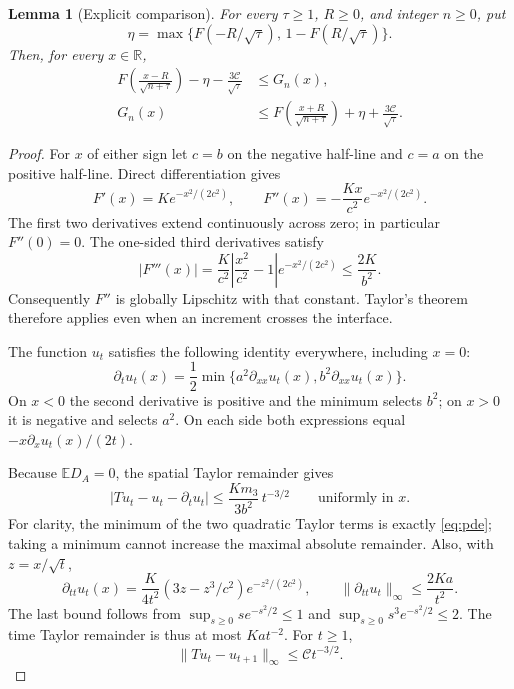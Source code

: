 \documentclass[11pt,a4paper]{article}
\newtheorem{lemma}[theorem]{Lemma}
\newcommand{\E}{\mathbb E}
\newcommand{\R}{\mathbb R}
\begin{document}
\begin{lemma}[Explicit comparison]\label{lem:comparison}
For every $\tau\ge1$, $R\ge0$, and integer $n\ge0$, put
\[
\eta=\max\{F(-R/\sqrt\tau),\,1-F(R/\sqrt\tau)\}.
\]
Then, for every $x\in\R$,
\begin{equation}\label{eq:barrier}
\boxed{\begin{aligned}
F\!\left(\frac{x-R}{\sqrt{n+\tau}}\right)
-\eta-\frac{3\mathcal C}{\sqrt\tau}
&\le G_n(x),\\
G_n(x)&\le
F\!\left(\frac{x+R}{\sqrt{n+\tau}}\right)
+\eta+\frac{3\mathcal C}{\sqrt\tau}.
\end{aligned}}
\end{equation}
\end{lemma}
\begin{proof}
For $x$ of either sign let $c=b$ on the negative half-line and $c=a$
on the positive half-line. Direct differentiation gives
\[
F'(x)=Ke^{-x^2/(2c^2)},\qquad
F''(x)=-\frac{Kx}{c^2}e^{-x^2/(2c^2)}.
\]
The first two derivatives extend continuously across zero; in particular
$F''(0)=0$. The one-sided third derivatives satisfy
\[
|F'''(x)|=\frac K{c^2}
\left|\frac{x^2}{c^2}-1\right|e^{-x^2/(2c^2)}
\le\frac{2K}{b^2}.
\]
Consequently $F''$ is globally Lipschitz with that constant. Taylor's
theorem therefore applies even when an increment crosses the interface.

The function $u_t$ satisfies the following identity everywhere,
including $x=0$:
\begin{equation}\label{eq:pde}
\partial_tu_t(x)
=\frac12\min\{a^2\partial_{xx}u_t(x),b^2\partial_{xx}u_t(x)\}.
\end{equation}
On $x<0$ the second derivative is positive and the minimum selects
$b^2$; on $x>0$ it is negative and selects $a^2$. On each side both
expressions equal $-x\partial_xu_t(x)/(2t)$.

Because $\E D_A=0$, the spatial Taylor remainder gives
\[
\left|Tu_t-u_t-\partial_tu_t\right|
\le\frac{Km_3}{3b^2}\,t^{-3/2}
\qquad\text{uniformly in }x.
\]
For clarity, the minimum of the two quadratic Taylor terms is exactly
\eqref{eq:pde}; taking a minimum cannot increase the maximal absolute
remainder. Also, with $z=x/\sqrt t$,
\[
\partial_{tt}u_t(x)
=\frac K{4t^2}(3z-z^3/c^2)e^{-z^2/(2c^2)},
\qquad \|\partial_{tt}u_t\|_\infty\le\frac{2Ka}{t^2}.
\]
The last bound follows from
$\sup_{s\ge0}se^{-s^2/2}\le1$ and
$\sup_{s\ge0}s^3e^{-s^2/2}\le2$.
The time Taylor remainder is thus at most $Ka t^{-2}$. For $t\ge1$,
\begin{equation}\label{eq:local}
\|Tu_t-u_{t+1}\|_\infty\le\mathcal C t^{-3/2}.
\end{equation}


\end{proof}
\end{document}
